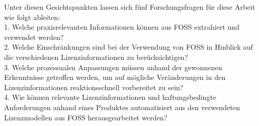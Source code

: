 Unter diesen Gesichtspunkten lassen sich fünf Forschungsfragen für diese Arbeit wie folgt ableiten:\\ 

1. Welche praxisrelevanten Informationen können aus FOSS extrahiert und verwendet werden?\\ 



2. Welche Einschränkungen sind bei der Verwendung von FOSS in Hinblick auf die verschiedenen Lizenzinformationen zu berücksichtigen?\\ 



3. Welche prozessualen Anpassungen müssen anhand der gewonnenen Erkenntnisse getroffen werden, um auf mögliche Veränderungen in den Lizenzinformationen reaktionsschnell vorbereitet zu sein?\\ 








4. Wie können relevante Lizenzinformationen und haftungsbedingte Anforderungen anhand eines Produktes automatisiert aus den verwendeten Lizenzmodellen aus FOSS herausgearbeitet werden?\\ 

